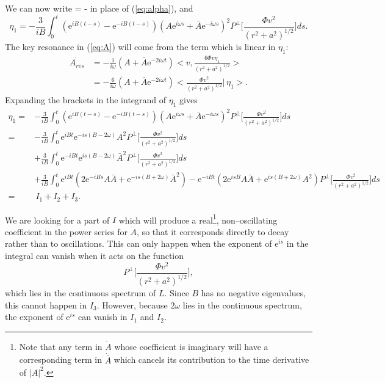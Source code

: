 We can now write
\be
\label{eq:A}
 = -
\ee
in place of (\ref{eq:alpha}), and
\[
\eta_1 = -\frac{3}{iB} \int_0^t(\mathrm{e}^{iB(t-s)}-\mathrm{e}^{-iB(t-s)})
(A\mathrm{e}^{i\omega s} + \bar{A}\mathrm{e}^{-i\omega s})^2P^\perp\bigg[\frac{\Phi v^2}{(r^2+a^2)^{1/2}}\bigg]ds.
\]
The key resonance in (\ref{eq:A}) will come from the term which is linear in $\eta_1$:
\begin{align}
\dot{A_{res}} &= -\frac{1}{i\omega}(A + \bar{A}\mathrm{e}^{-2i\omega t})\bigg<v,\frac{6\Phi v\eta_1}{(r^2+a^2)^{1/2}}\bigg> 
\\
&=-\frac{6}{i\omega}(A + \bar{A}\mathrm{e}^{-2i\omega t}) 
\bigg<\frac{\Phi v^2}{(r^2+a^2)^{1/2}} \bigg|\,\eta_1\bigg>. \label{eq:AI}
\end{align}
Expanding the brackets in the integrand of $\eta_1$ gives
\begin{align*}  
\eta_1 =& -\frac{3}{iB}\int_0^t(\mathrm{e}^{iB(t-s)}-\mathrm{e}^{-iB(t-s)})
(A\mathrm{e}^{i\omega s} + \bar{A}\mathrm{e}^{-i\omega s})^2P^\perp\bigg[\frac{\Phi v^2}{(r^2+a^2)^{1/2}}\bigg]ds \\
=& -\frac{3}{iB}\int_0^t \mathrm{e}^{iBt}\mathrm{e}^{-is(B-2\omega)}A^2P^\perp\bigg[\frac{\Phi v^2}{(r^2+a^2)^{1/2}}\bigg]ds \\
&+ \frac{3}{iB}\int_0^t \mathrm{e}^{-iBt}\mathrm{e}^{is(B-2\omega)}\bar{A}^2P^\perp\bigg[\frac{\Phi v^2}{(r^2+a^2)^{1/2}}\bigg]ds \\
& +\frac{3}{iB}\int_0^t \mathrm{e}^{iBt}(2\mathrm{e}^{-iBs}A\bar{A} + \mathrm{e}^{-is(B+2\omega)}\bar{A}^2) - \mathrm{e}^{-iBt}(2\mathrm{e}^{isB}A\bar{A} + \mathrm{e}^{is(B+2\omega)}A^2)P^\perp\bigg[\frac{\Phi v^2}{(r^2+a^2)^{1/2}}\bigg]ds \\[2pt]
 =& \, I_1 + I_2 + I_3.
\end{align*}

We are looking for a part of $I$ which will produce a real\footnote{Note that any term in $\dot{A}$ whose coefficient is imaginary will have a corresponding term in $\dot{\bar{A}}$ which cancels its contribution to the time derivative of $|A|^2$.}, non--oscillating coefficient in the power series for $\dot{A}$, so that it corresponds directly to decay rather than to oscillations. This can only happen when the exponent of $\mathrm{e}^{is}$ in the integral can vanish when it acts on the function
\[
P^\perp\bigg[\frac{\Phi v^2}{(r^2+a^2)^{1/2}}\bigg],
\]
which lies in the continuous spectrum of $L$. Since $B$ has no negative eigenvalues, this cannot happen in $I_3$. However, because $2\omega$ lies in the continuous spectrum, the exponent of $\mathrm{e}^{is}$ can vanish in $I_1$ and $I_2$.

